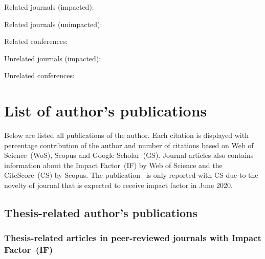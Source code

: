 \documentclass[a4paper,11pt,titlepage,twoside]{book}
\newcommand{\conditionalClearPage}{
  \ifdefined\printversion
  \clearemptydoublepage
  \else
  \newpage{}
  \clearpage
\fi
}
\begin{document}

Related journals (impacted):
\cite{baca2019autonomous}
\cite{baca2018rospix}
\cite{spurny2018cooperative}
\cite{saska2016system}
\cite{giernacky2019realtime}
\cite{chudoba2016exploration}

Related journals (unimpacted):
\cite{loianno2018localization}

Related conferences:
\cite{baca2019timepix}
\cite{baca2018model}
\cite{baca2016embedded}
\cite{baca2017autonomous}
\cite{saska2017documentation}
\cite{spurny2016mmar}
\cite{faigl2017onsolution}
\cite{saska2016migrating}

Unrelated journals (impacted):
\cite{baca2016miniaturized}
\cite{baca2018vzlusat}
\cite{daniel2019inorbit}
\cite{urban2017vzlusat}

Unrelated conferences:
\cite{daniel2016terrestrial}
\cite{daniel2017xray}



\conditionalClearPage
\printbibliography[notkeyword=mine]
\conditionalClearPage



\appendix
\renewcommand\chaptername{Appendix}

\chapter{List of author's publications}

Below are listed all publications of the author.
Each citation is displayed with percentage contribution of the author and number of citations based on Web of Science~(WoS), Scopus and Google Scholar~(GS).
Journal articles also contains information about the Impact Factor~(IF) by Web of Science and the CiteScore~(CS) by Scopus.
The publication~\cite{loianno2018localization} is only reported with CS due to the novelty of journal that is expected to receive impact factor in June 2020.

\section{Thesis-related author's publications}

\subsection*{Thesis-related articles in peer-reviewed journals with Impact Factor~(IF)}
\nocite{}
\printbibliography[keyword={mine},keyword={phd_related},keyword={journal},keyword={if},heading=none,title={}]
\end{document}
